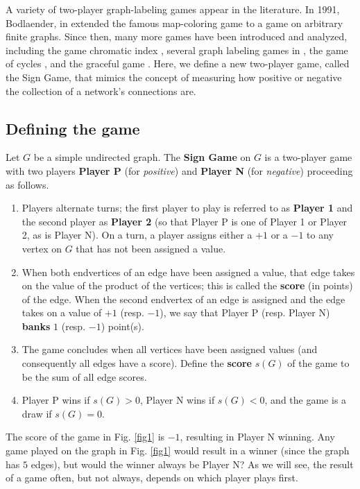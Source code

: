 \documentclass[amsart,11pt]{article}
\theoremstyle{dotless}
\theoremstyle{dotless}
\begin{document}
A variety of two-player graph-labeling games appear in the literature. In 1991, Bodlaender, in \cite{1} extended the famous map-coloring game to a game on arbitrary finite graphs. Since then, many more games have been introduced and analyzed, including the game chromatic index \cite{3}, several graph labeling games in \cite{6}, the game of cycles \cite{5}, and the graceful game \cite{4}. Here, we define a new two-player game, called the Sign Game, that mimics the concept of measuring how positive or negative the collection of a network's connections are. 

\subsection{Defining the game}

Let $G$ be a simple undirected graph. The \textbf{Sign Game} on $G$ is a two-player game with two players \textbf{Player P} (for \textit{positive}) and \textbf{Player N} (for \textit{negative}) proceeding as follows.

\begin{enumerate}
\item Players alternate turns; the first player to play is referred to as \textbf{Player 1} and the second player as \textbf{Player 2} (so that Player P is one of Player 1 or Player 2, as is Player N). On a turn, a player assigns either a $+1$ or a $-1$ to any vertex on $G$ that has not been assigned a value.
\item When both endvertices of an edge have been assigned a value, that edge takes on the value of the product of the vertices; this is called the \textbf{score} (in points) of the edge. When the second endvertex of an edge is assigned and the edge takes on a value of $+1$ (resp. $-1$), we say that Player P (resp. Player N) \textbf{banks} $1$ (resp. $-1$) point(s). 
\item The game concludes when all vertices have been assigned values (and consequently all edges have a score). Define the \textbf{score} $s(G)$ of the game to be the sum of all edge scores.
\item Player P wins if $s(G) > 0$, Player N wins if $s(G) < 0$, and the game is a draw if $s(G) = 0$. 
\end{enumerate}

The score of the game in Fig. \ref{fig1} is $-1$, resulting in Player N winning. Any game played on the graph in Fig. \ref{fig1} would result in a winner (since the graph has $5$ edges), but would the winner always be Player N? As we will see, the result of a game often, but not always, depends on which player plays first. 
\end{document}
